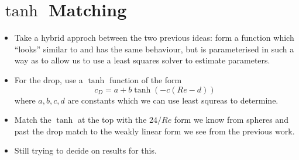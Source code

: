 \section{$\tanh$ Matching}

\begin{itemize}
\item Take a hybrid approch between the two previous ideas: form a function which ``looks'' similar
to \citet{Morrison2010} and has the same behaviour, but is parameterised in such a way as to allow
us to use a least squares solver to estimate parameters.
\item For the drop, use a $\tanh$ function of the form
\[
c_{D} = a + b \tanh (-c(Re - d))
\]
where $a,b,c,d$ are constants which we can use least squreas to determine.
\item Match the $\tanh$ at the top with the $24/Re$ form we know from spheres and past the drop match
to the weakly linear form we see from the previous work.
\item Still trying to decide on results for this.
\end{itemize}